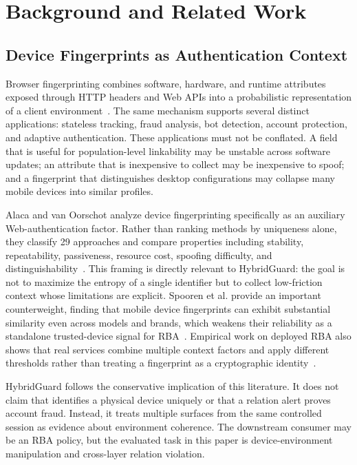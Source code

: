 \section{Background and Related Work}
\label{sec:background-related}

\subsection{Device Fingerprints as Authentication Context}

Browser fingerprinting combines software, hardware, and runtime attributes exposed through HTTP headers and Web APIs into a probabilistic representation of a client environment~\cite{laperdrix2020browser,eckersley2010unique}. The same mechanism supports several distinct applications: stateless tracking, fraud analysis, bot detection, account protection, and adaptive authentication. These applications must not be conflated. A field that is useful for population-level linkability may be unstable across software updates; an attribute that is inexpensive to collect may be inexpensive to spoof; and a fingerprint that distinguishes desktop configurations may collapse many mobile devices into similar profiles.

Alaca and van Oorschot analyze device fingerprinting specifically as an auxiliary Web-authentication factor. Rather than ranking methods by uniqueness alone, they classify 29 approaches and compare properties including stability, repeatability, passiveness, resource cost, spoofing difficulty, and distinguishability~\cite{alaca2016device}. This framing is directly relevant to HybridGuard: the goal is not to maximize the entropy of a single identifier but to collect low-friction context whose limitations are explicit. Spooren et al. provide an important counterweight, finding that mobile device fingerprints can exhibit substantial similarity even across models and brands, which weakens their reliability as a standalone trusted-device signal for RBA~\cite{spooren2015harmful}. Empirical work on deployed RBA also shows that real services combine multiple context factors and apply different thresholds rather than treating a fingerprint as a cryptographic identity~\cite{wiefling2019really}.

HybridGuard follows the conservative implication of this literature. It does not claim that \appfp identifies a physical device uniquely or that a relation alert proves account fraud. Instead, it treats multiple surfaces from the same controlled session as evidence about environment coherence. The downstream consumer may be an RBA policy, but the evaluated task in this paper is device-environment manipulation and cross-layer relation violation.

